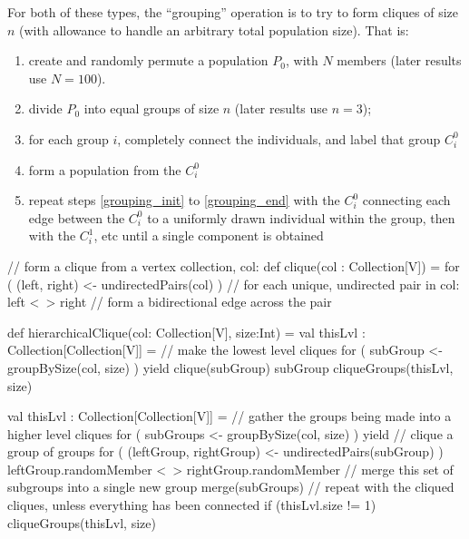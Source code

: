 \documentclass{article}
\begin{document}
For both of these types, the ``grouping'' operation is to try to form cliques of size $n$ (with allowance to handle an arbitrary total population size).  That is:\begin{enumerate}
\item create and randomly permute a population $P_0$, with $N$ members (later results use $N=100$).
\item\label{grouping_init} divide $P_0$ into equal groups of size $n$ (later results use $n=3$);
\item for each group $i$, completely connect the individuals, and label that group $C_i^0$
\item\label{grouping_end} form a population from the $C_i^0$
\item repeat steps \ref{grouping_init} to \ref{grouping_end} with the $C_i^0$ connecting each edge between the $C_i^0$ to a uniformly drawn individual within the group, then with the $C_i^1$, etc until a single component is obtained
\end{enumerate}

\begin{code}[title=Pseudo-Code: Hierarchical Cliques]
// form a clique from a vertex collection, col:
def clique(col : Collection[V]) =
    for ( (left, right) <- undirectedPairs(col) ) // for each unique, undirected pair in col:
      left <~> right // form a bidirectional edge across the pair
      
def hierarchicalClique(col: Collection[V], size:Int) = 
   val thisLvl : Collection[Collection[V]] =
     // make the lowest level cliques 
     for ( subGroup <- groupBySize(col, size) ) yield {
       clique(subGroup)
       subGroup
     }
   cliqueGroups(thisLvl, size)
   
  val thisLvl : Collection[Collection[V]] =
    // gather the groups being made into a higher level cliques
    for ( subGroups <- groupBySize(col, size) ) yield {
      // clique a group of groups
      for ( (leftGroup, rightGroup) <- undirectedPairs(subGroup) ) {
        leftGroup.randomMember <~> rightGroup.randomMember
      }
      // merge this set of subgroups into a single new group
      merge(subGroups)
    }
  // repeat with the cliqued cliques, unless everything has been connected
  if (thisLvl.size != 1) cliqueGroups(thisLvl, size)  
\end{code}
\end{document}
